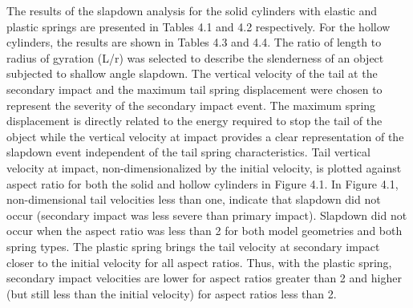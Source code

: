      The results of the slapdown analysis for the solid cylinders
with elastic and plastic springs
are presented in Tables 4.1 and 4.2
respectively.  For the hollow cylinders, the results are shown
in Tables 4.3 and 4.4.
The ratio of length to
radius of gyration (L/r) was
selected to describe the slenderness of an object
subjected to shallow angle slapdown.
The vertical velocity of the tail
at the secondary impact and the maximum tail spring displacement
were chosen to represent the severity of the secondary
impact event.  The maximum spring displacement is directly related to
the energy required to stop the tail of the object while the vertical
velocity at impact provides a clear representation of the slapdown
event independent of the tail spring characteristics. Tail vertical
velocity at impact, non-dimensionalized by the initial velocity, is
plotted against aspect ratio for both the solid and hollow
cylinders in Figure 4.1.
In Figure 4.1, non-dimensional tail velocities
less than one, indicate that slapdown did not occur (secondary impact
was less severe than primary impact).  Slapdown did not occur when the
aspect ratio was less than 2 for both model geometries and both
spring types.  The plastic spring brings the tail
velocity at secondary impact closer to the initial velocity for all
aspect ratios.  Thus, with the plastic spring, secondary impact
velocities are lower for aspect ratios greater than 2 and higher
(but still less than the initial velocity) for aspect ratios less
than 2.

